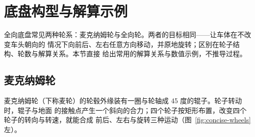 \section{底盘构型与解算示例}
\label{sec:concise-wheel-kinematics}

全向底盘常见两种轮系：麦克纳姆轮与全向轮。两者的目标相同——让车体在不改变车头朝向的
情况下向前后、左右任意方向移动，并原地旋转；区别在轮子结构、轮数与解算关系。本节直接
给出常用的解算关系与数值示例，不推导过程。

\subsection{麦克纳姆轮}

麦克纳姆轮（下称麦轮）的轮毂外缘装有一圈与轮轴成 45 度的辊子。轮子转动时，辊子与地面
的接触点产生一个斜向的合力；四个轮子按矩形布置，改变四个轮子的转向与转速，就能合成
前后、左右与旋转三种运动（图~\ref{fig:concise-wheels} 左）。

